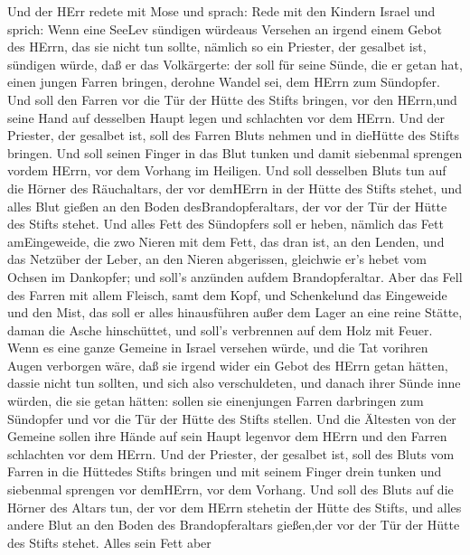  Und der HErr redete mit Mose und sprach:  Rede
mit den Kindern Israel und sprich: Wenn eine SeeLev sündigen würdeaus
Versehen an irgend einem Gebot des HErrn, das sie nicht tun sollte,
 nämlich so ein Priester, der gesalbet ist, sündigen würde,
daß er das Volkärgerte: der soll für seine Sünde, die er getan hat,
einen jungen Farren bringen, derohne Wandel sei, dem HErrn zum
Sündopfer.  Und soll den Farren vor die Tür der Hütte des
Stifts bringen, vor den HErrn,und seine Hand auf desselben Haupt legen
und schlachten vor dem HErrn.  Und der Priester, der
gesalbet ist, soll des Farren Bluts nehmen und in dieHütte des Stifts
bringen.  Und soll seinen Finger in das Blut tunken und
damit siebenmal sprengen vordem HErrn, vor dem Vorhang im Heiligen.
 Und soll desselben Bluts tun auf die Hörner des
Räuchaltars, der vor demHErrn in der Hütte des Stifts stehet, und alles
Blut gießen an den Boden desBrandopferaltars, der vor der Tür der Hütte
des Stifts stehet.  Und alles Fett des Sündopfers soll er
heben, nämlich das Fett amEingeweide,  die zwo Nieren mit
dem Fett, das dran ist, an den Lenden, und das Netzüber der Leber, an
den Nieren abgerissen,  gleichwie er's hebet vom Ochsen im
Dankopfer; und soll's anzünden aufdem Brandopferaltar. 
Aber das Fell des Farren mit allem Fleisch, samt dem Kopf, und
Schenkelund das Eingeweide und den Mist,  das soll er alles
hinausführen außer dem Lager an eine reine Stätte, daman die Asche
hinschüttet, und soll's verbrennen auf dem Holz mit Feuer. 
Wenn es eine ganze Gemeine in Israel versehen würde, und die Tat
vorihren Augen verborgen wäre, daß sie irgend wider ein Gebot des HErrn
getan hätten, dassie nicht tun sollten, und sich also verschuldeten,
 und danach ihrer Sünde inne würden, die sie getan hätten:
sollen sie einenjungen Farren darbringen zum Sündopfer und vor die Tür
der Hütte des Stifts stellen.  Und die Ältesten von der
Gemeine sollen ihre Hände auf sein Haupt legenvor dem HErrn und den
Farren schlachten vor dem HErrn.  Und der Priester, der
gesalbet ist, soll des Bluts vom Farren in die Hüttedes Stifts bringen
 und mit seinem Finger drein tunken und siebenmal sprengen
vor demHErrn, vor dem Vorhang.  Und soll des Bluts auf die
Hörner des Altars tun, der vor dem HErrn stehetin der Hütte des Stifts,
und alles andere Blut an den Boden des Brandopferaltars gießen,der vor
der Tür der Hütte des Stifts stehet.  Alles sein Fett aber
